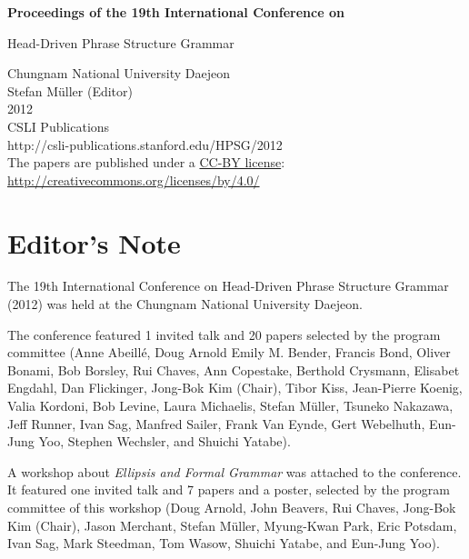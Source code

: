 \documentclass[11pt,a4paper,fleqn]{article}
\begin{document}
\begin{center}
{\Large
                {\bfseries Proceedings of the 19th International Conference on\par Head-Driven Phrase Structure Grammar\par}

                \vspace{8ex}

                     Chungnam National University Daejeon\\[\baselineskip]

                        Stefan M{\"u}ller (Editor)\\[\baselineskip]

                                2012\\[\baselineskip]

                          CSLI Publications\\[\baselineskip]

              http://csli-publications.stanford.edu/HPSG/2012 \\[4\baselineskip]

The papers are published under a \href{http://creativecommons.org/licenses/by/4.0/}{CC-BY license}:\\[3pt]
\href{http://creativecommons.org/licenses/by/4.0/}{http://creativecommons.org/licenses/by/4.0/}
}
\end{center}
\newpage
\tableofcontents

\newpage

\section{Editor's Note}
The 19th International Conference on Head-Driven Phrase Structure Grammar (2012) was held at the Chungnam National University Daejeon.

The conference featured 1 invited talk and 20 papers selected by the program committee (Anne
Abeillé,
Doug Arnold
Emily M. Bender,
Francis Bond,
Oliver Bonami,
Bob Borsley,
Rui Chaves,	Ann Copestake,
Berthold Crysmann, 	Elisabet Engdahl,
Dan Flickinger, 	Jong-Bok Kim (Chair),
Tibor Kiss, 	Jean-Pierre Koenig,
Valia Kordoni, 	Bob Levine,
Laura Michaelis, 	Stefan Müller,
Tsuneko Nakazawa, 	Jeff Runner,
Ivan Sag, 	Manfred Sailer,
Frank Van Eynde, 	Gert Webelhuth,
Eun-Jung Yoo, 	Stephen Wechsler, and
Shuichi Yatabe).

A workshop about \emph{Ellipsis and Formal Grammar}
was attached to the conference. It featured one invited talk and 7 papers and a poster, selected by the program
committee of this workshop (Doug Arnold, 	John Beavers,
Rui Chaves, 	Jong-Bok Kim (Chair),
Jason Merchant, 	Stefan Müller,
Myung-Kwan Park, 	Eric Potsdam,
Ivan Sag, 	Mark Steedman,
Tom Wasow, 	Shuichi Yatabe, and
Eun-Jung Yoo).
\end{document}
